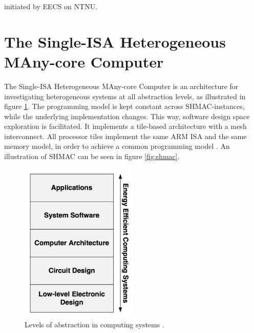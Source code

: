 
initiated by EECS on NTNU. \cite{shmac-plan}

\section{The Single-ISA Heterogeneous MAny-core Computer}
\label{sec:shmac}
The Single-ISA Heterogeneous MAny-core Computer is an architecture for investigating heterogeneous systems at all abstraction levels, as illustrated in figure \ref{fig:shmacAbstractionLevels}.
The programming model is kept constant across SHMAC-instances, while the underlying implementation changes.
This way, software design space exploration is facilitated.
It implements a tile-based architecture with a mesh interconnect. All processor tiles implement the same
ARM ISA and the same memory model, in order to achieve a common programming model \cite{shmac-plan}.
An illustration of SHMAC can be seen in figure \ref{fig:shmac}.

\begin{figure}[htb]
    \centering
    \includegraphics[width=0.5\textwidth]{Figures/Heterogeneous/SHMACAbstractionLevels}
    \caption{Levels of abstraction in computing systems \cite{shmac-plan}.}
    \label{fig:shmacAbstractionLevels}
\end{figure}

